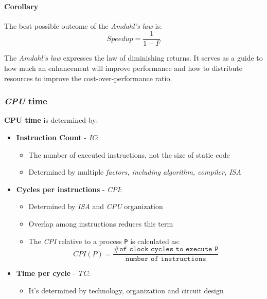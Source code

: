 \documentclass[english]{article}
\begin{document}
\paragraph{Corollary}

The best possible outcome of the \textit{Amdahl's law} is:
\[ Speedup = \dfrac{1}{1 - F} \]


The \textit{Amdahl's law} expresses the law of diminishing returns.
It serves as a guide to how much an enhancement will improve performance and how to distribute resources to improve the cost-over-performance ratio.

\subsubsection{\textit{CPU} time}

\textbf{CPU time} is determined by:

\begin{itemize}
  \item \textbf{Instruction Count} - \textit{IC}:
        \begin{itemize}
          \item The number of executed instructions, not the size of static code
          \item Determined by multiple \textit{factors, including algorithm, compiler, ISA}
        \end{itemize}
  \item \textbf{Cycles per instructions} - \textit{CPI}:
        \begin{itemize}
          \item Determined by \textit{ISA} and \textit{CPU} organization
          \item Overlap among instructions reduces this term
          \item The \textit{CPI} relative to a process \texttt{P} is calculated as:
                \[ CPI(P) = \dfrac{\texttt{\# of clock cycles to execute P}}{\texttt{number of instructions}} \]
        \end{itemize}
  \item \textbf{Time per cycle} - \textit{TC}:
        \begin{itemize}
          \item It's determined by technology, organization and circuit design
        \end{itemize}
\end{itemize}
\end{document}
